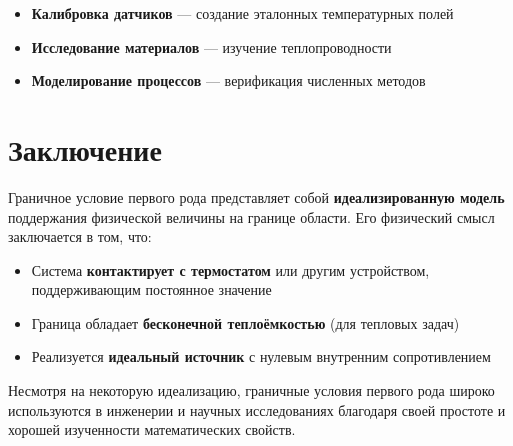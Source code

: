\documentclass[12pt]{article}
\begin{document}
	\begin{itemize}
		\item \textbf{Калибровка датчиков} — создание эталонных температурных полей
		\item \textbf{Исследование материалов} — изучение теплопроводности
		\item \textbf{Моделирование процессов} — верификация численных методов
	\end{itemize}
	
	\section*{Заключение}
	
	Граничное условие первого рода представляет собой \textbf{идеализированную модель} поддержания физической величины на границе области. Его физический смысл заключается в том, что:
	
	\begin{itemize}
		\item Система \textbf{контактирует с термостатом} или другим устройством, поддерживающим постоянное значение
		\item Граница обладает \textbf{бесконечной теплоёмкостью} (для тепловых задач)
		\item Реализуется \textbf{идеальный источник} с нулевым внутренним сопротивлением
	\end{itemize}
	
	Несмотря на некоторую идеализацию, граничные условия первого рода широко используются в инженерии и научных исследованиях благодаря своей простоте и хорошей изученности математических свойств.
	
\end{document}
